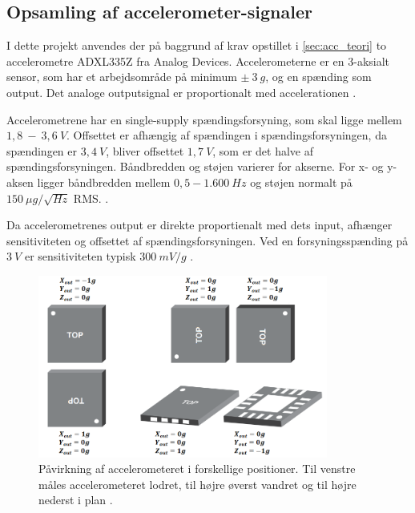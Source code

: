 \subsection{Opsamling af accelerometer-signaler}\label{sec:acc_krav}

I dette projekt anvendes der på baggrund af krav opstillet i \autoref{sec:acc_teori} to accelerometre ADXL335Z fra Analog Devices. Accelerometerne er en 3-aksialt sensor, som har et arbejdsområde på minimum $\pm~3~g$, og en spænding som output. Det analoge outputsignal er proportionalt med accelerationen \citep{analogdevices2009}. 

Accelerometrene har en single-supply spændingsforsyning, som skal ligge mellem $1,8~-~3,6~V$.  Offsettet er afhængig af spændingen i spændingsforsyningen, da spændingen er $3,4~V$, bliver offsettet $1,7~V$, som er det halve af spændingsforsyningen. Båndbredden og støjen varierer for akserne. For x- og y-aksen ligger båndbredden mellem $0,5 - 1.600~Hz$ og støjen normalt på $150~\mu g/\sqrt{Hz}$ RMS.  \citep{analogdevices2010}. %

Da accelerometrenes output er direkte proportienalt med dets input, afhænger sensitiviteten og offsettet af spændingsforsyningen. Ved en forsyningsspænding på $3~V$ er sensitiviteten typisk $300~mV/g$ \citep{analogdevices2010}. 


\begin{figure}[H]
\centering
\includegraphics[width=0.85\textwidth]{figures/acc_paavirkning}
\caption{Påvirkning af accelerometeret i forskellige positioner. Til venstre måles accelerometeret lodret, til højre øverst vandret og til højre nederst i plan \citep{analogdevices2010}.}
\label{fig:acc}
\end{figure}

